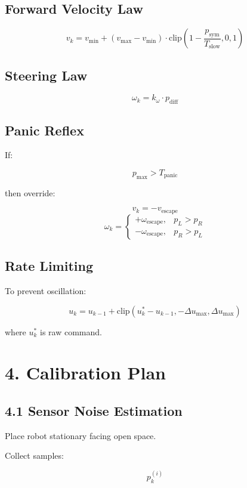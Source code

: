 \documentclass[11pt]{article}
\begin{document}
\subsection*{Forward Velocity Law}

\[
v_k =
v_{\min} +
(v_{\max} - v_{\min})
\cdot
\text{clip}
\left(
1 - \frac{p_{\text{sym}}}{T_{\text{slow}}},
0, 1
\right)
\]

\subsection*{Steering Law}

\[
\omega_k = k_\omega \cdot p_{\text{diff}}
\]

\subsection*{Panic Reflex}

If:

\[
p_{\max} > T_{\text{panic}}
\]

then override:

\[
v_k = -v_{\text{escape}}
\]
\[
\omega_k = 
\begin{cases}
+\omega_{\text{escape}}, & p_L > p_R \\
-\omega_{\text{escape}}, & p_R > p_L
\end{cases}
\]

\subsection*{Rate Limiting}

To prevent oscillation:

\[
u_k = u_{k-1} + \text{clip}(u_k^\ast - u_{k-1}, -\Delta u_{\max}, \Delta u_{\max})
\]

where $u_k^\ast$ is raw command.

\section{4. Calibration Plan}

\subsection*{4.1 Sensor Noise Estimation}

Place robot stationary facing open space.

Collect samples:

\[
p_k^{(i)}
\]
\end{document}
